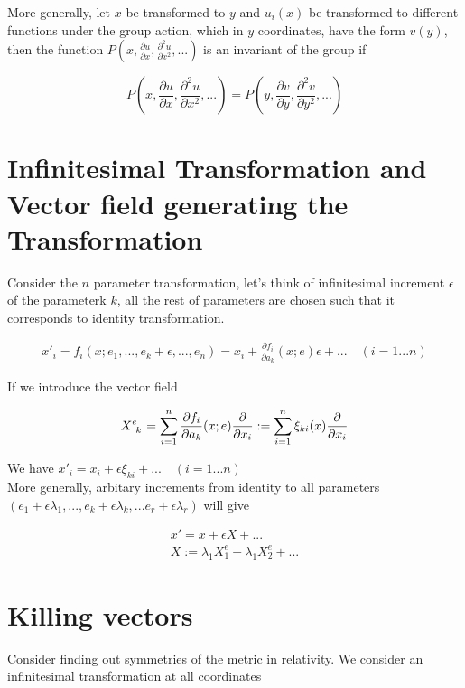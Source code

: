 \documentclass{report}
\begin{document}
\noindent More generally, let $x$ be transformed to $y$ and $u_i(x)$ be transformed to different functions under the group action, which in $y$ coordinates, have the form $v(y)$, then the function $P(x,\frac{\partial u}{\partial x}, \frac{\partial ^2 u}{\partial x^2},...)$ is an invariant of the group if 

$$ P\left(x,\frac{\partial u}{\partial x}, \frac{\partial ^2 u}{\partial x^2},...\right) = P\left(y,\frac{\partial v}{\partial y}, \frac{\partial ^2 v}{\partial y^2},...\right)$$

\section{Infinitesimal Transformation and Vector field generating the Transformation}

Consider the $n$ parameter transformation, let's think of infinitesimal increment $\epsilon$ of the parameterk $k$, all the rest of parameters are chosen such that it corresponds to identity transformation.

\begin{align}
x'_i = f_i(x;e_1,...,e_k+\epsilon,...,e_n)
= x_i + \frac{\partial f_i}{\partial a_k} (x;e)\epsilon + ... \quad(i = 1...n)
\end{align}

\noindent If we introduce the vector field

$$X\indices{^e_k} = \sum_{i=1}^{n} \frac{\partial f_i}{\partial a_k}(x;e) \frac{\partial}{\partial x_i} := \sum_{i=1}^{n}\xi_{ki}(x)\frac{\partial}{\partial x_i}$$

\noindent We have $x'_i = x_i + \epsilon \xi_{ki} + ... \quad (i=1...n)$\\

\noindent More generally, arbitary increments from identity to all parameters $(e_1 + \epsilon\lambda_1,...,e_k+\epsilon\lambda_k,...e_r+\epsilon\lambda_r)$ will give

\begin{gather}
x' = x + \epsilon X +...\\
X := \lambda_1 X_1^e + \lambda_1 X_2^e+...
\end{gather}
\section{Killing vectors}

Consider finding out symmetries of the metric in relativity. We consider an infinitesimal transformation at all coordinates
\end{document}
